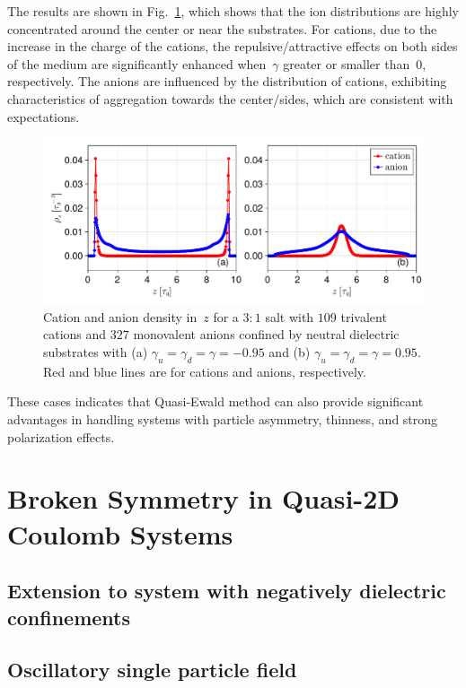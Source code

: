 The results are shown in Fig.~\ref{fig:salt3-1}, which shows that the ion distributions are highly concentrated around the center or near the substrates.
For cations, due to the increase in the charge of the cations, the repulsive/attractive effects on both sides of the medium are significantly enhanced when~$\gamma$ greater or smaller than~$0$, respectively.
The anions are influenced by the distribution of cations, exhibiting characteristics of aggregation towards the center/sides, which are consistent with expectations.

\begin{figure}[htb]
  \centering
  \includegraphics[width = \linewidth]{figs/density_3-1.pdf}

  \caption{
    Cation and anion density in~$z$ for a $3:1$ salt with $109$ trivalent cations and $327$ monovalent anions confined by neutral dielectric substrates with (a) $\gamma_u = \gamma_d = \gamma = - 0.95$ and (b) $\gamma_u = \gamma_d = \gamma = 0.95$.
    Red and blue lines are for cations and anions, respectively.
  }
    \label{fig:salt3-1}
\end{figure}

These cases indicates that Quasi-Ewald method can also provide significant advantages in handling systems with particle asymmetry, thinness, and strong polarization effects.

\section{Broken Symmetry in Quasi-2D Coulomb Systems}

\subsection{Extension to system with negatively dielectric confinements}

\subsection{Oscillatory single particle field}

